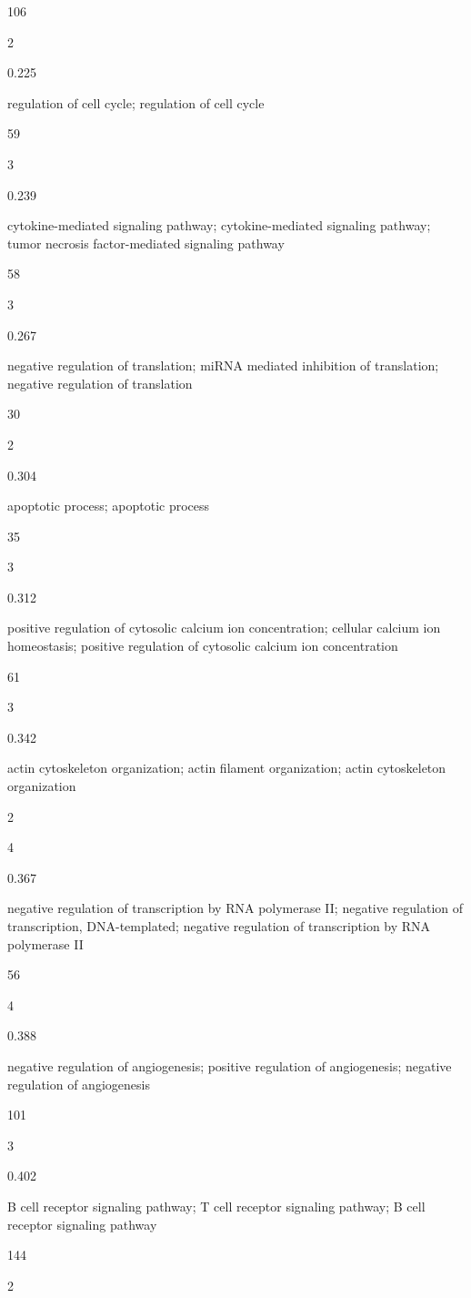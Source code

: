 \documentclass[
  letterpaper,
  DIV=11,
  numbers=noendperiod,
  openany,
  oneside]{scrreprt}
\begin{document}
106

2

0.225

regulation of cell cycle; regulation of cell cycle

59

3

0.239

cytokine-mediated signaling pathway; cytokine-mediated signaling
pathway; tumor necrosis factor-mediated signaling pathway

58

3

0.267

negative regulation of translation; miRNA mediated inhibition of
translation; negative regulation of translation

30

2

0.304

apoptotic process; apoptotic process

35

3

0.312

positive regulation of cytosolic calcium ion concentration; cellular
calcium ion homeostasis; positive regulation of cytosolic calcium ion
concentration

61

3

0.342

actin cytoskeleton organization; actin filament organization; actin
cytoskeleton organization

2

4

0.367

negative regulation of transcription by RNA polymerase II; negative
regulation of transcription, DNA-templated; negative regulation of
transcription by RNA polymerase II

56

4

0.388

negative regulation of angiogenesis; positive regulation of
angiogenesis; negative regulation of angiogenesis

101

3

0.402

B cell receptor signaling pathway; T cell receptor signaling pathway; B
cell receptor signaling pathway

144

2
\end{document}
